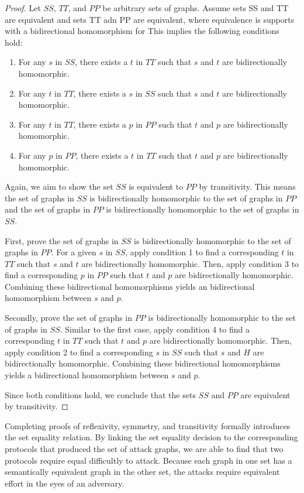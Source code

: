 \documentclass[runningheads]{llncs}
\theoremstyle{definition}
\newcommand{\squash}{\itemsep=0pt\parskip=0pt}
\begin{document}
\begin{proof}
Let $SS$, $TT$, and $PP$ be arbitrary sets of graphs. Assume sets SS and TT are equivalent and sets TT adn PP are equivalent, where equivalence is supports with a bidirectional homomorphism for This implies the following conditions hold:
\begin{enumerate}
    \squash
    \item For any $s$ in $SS$, there exists a $t$ in $TT$ such that $s$ and $t$ are bidirectionally homomorphic.
    \item For any $t$ in $TT$, there exists a $s$ in $SS$ such that $s$ and $t$ are bidirectionally homomorphic.
    \item For any $t$ in $TT$, there exists a $p$ in $PP$ such that $t$ and $p$ are bidirectionally homomorphic.
    \item For any $p$ in $PP$, there exists a $t$ in $TT$ such that $t$ and $p$ are bidirectionally homomorphic.
\end{enumerate}

Again, we aim to show the set $SS$ is equivalent to $PP$ by transitivity. This means the set of graphs in $SS$ is bidirectionally homomorphic to the set of graphs in $PP$ and the set of graphs in $PP$ is bidirectionally homomorphic to the set of graphs in $SS$. 

First, prove the set of graphs in $SS$ is bidirectionally homomorphic to the set of graphs in $PP$. For a given $s$ in $SS$, apply condition 1 to find a corresponding $t$ in $TT$ such that $s$ and $t$ are bidirectionally homomorphic. Then, apply condition 3 to find a corresponding $p$ in $PP$ such that $t$ and $p$ are bidirectionally homomorphic. Combining these bidirectional homomorphisms yields an bidirectional homomorphism between $s$ and $p$.

Secondly, prove the set of graphs in $PP$ is bidirectionally homomorphic to the set of graphs in $SS$. Similar to the first case, apply condition 4 to find a corresponding $t$ in $TT$ such that $t$ and $p$ are bidirectionally homomorphic. Then, apply condition 2 to find a corresponding $s$ in $SS$ such that $s$ and $H$ are bidirectionally homomorphic. Combining these bidirectional homomorphisms yields a bidirectional homomorphism between $s$ and $p$.

Since both conditions hold, we conclude that the sets $SS$ and $PP$ are equivalent by transitivity.
\end{proof}

\noindent Completing proofs of reflexivity, symmetry, and transitivity formally introduces the set equality relation. By linking the set equality decision to the corresponding protocols that produced the set of attack graphs, we are able to find that two protocols require equal difficultly to attack. Because each graph in one set has a semantically equivalent graph in the other set, the attacks require equivalent effort in the eyes of an adversary. 
\end{document}
